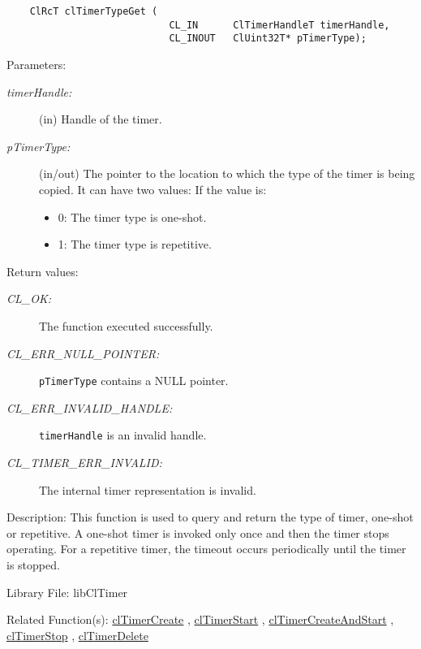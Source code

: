\begin{flushleft}
\begin{Desc}
\footnotesize\begin{verbatim}    ClRcT clTimerTypeGet (
                 			CL_IN      ClTimerHandleT timerHandle,
                 			CL_INOUT   ClUint32T* pTimerType);
\end{verbatim}
\normalsize
\end{Desc}
\begin{Desc}
\item[Parameters:]
\begin{description}
\item[{\em timer\-Handle:}](in) Handle of the timer. 
\item[{\em p\-Timer\-Type:}](in/out) The pointer to the location to which the type of the timer is being copied. It can have two values: If the 
value is: 
\begin{itemize}
\item 0: The timer type is one-shot. \item 1: The timer type is repetitive.\end{itemize}
\end{description}
\end{Desc}
\begin{Desc}
\item[Return values:]
\begin{description}
\item[{\em CL\_\-OK:}]The function executed successfully. 
\item[{\em CL\_\-ERR\_\-NULL\_\-POINTER:}]{\tt{pTimerType}} contains a NULL pointer. 
\item[{\em CL\_\-ERR\_\-INVALID\_\-HANDLE:}]{\tt{timerHandle}} is an invalid handle. 
\item[{\em CL\_\-TIMER\_\-ERR\_\-INVALID:}]The internal timer representation is invalid.\end{description}
\end{Desc}
\begin{Desc}
\item[Description:]This function is used to query and return the type of timer, one-shot or repetitive. A one-shot timer is 
invoked only once and then the timer stops operating. For a repetitive timer, the timeout occurs periodically until the timer is stopped.
\end{Desc}
\begin{Desc}
\item[Library File:]lib\-Cl\-Timer\end{Desc}
\begin{Desc}
\item[Related Function(s):]\hyperlink{group__group33}{cl\-Timer\-Create} , \hyperlink{group__group33}{cl\-Timer\-Start} , \hyperlink{group__group33}{cl\-Timer\-Create\-And\-Start} , \hyperlink{group__group33}{cl\-Timer\-Stop} , \hyperlink{group__group33}{cl\-Timer\-Delete} \end{Desc}


\end{flushleft}
